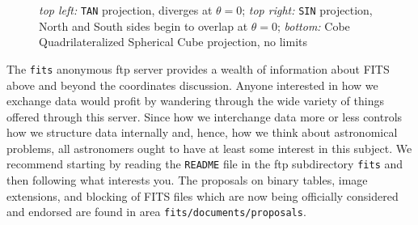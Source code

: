 \begin{figure}
\centerline{\hfill {} \hfill\hfill
             \hfill}
\centerline{}
\caption{{\it top left:\/} {\tt TAN} projection, diverges at $\theta =
   0$; {\it top right:\/} {\tt SIN} projection, North and South sides
   begin to overlap at $\theta = 0$; {\it bottom:\/} Cobe
   Quadrilateralized Spherical Cube projection, no limits }
\end{figure}

The {\tt fits} anonymous ftp server provides a wealth of information
about FITS above and beyond the coordinates discussion.  Anyone
interested in how we exchange data would profit by wandering through
the wide variety of things offered through this server.  Since how we
interchange data more or less controls how we structure data
internally and, hence, how we think about astronomical problems, all
astronomers ought to have at least some interest in this subject.  We
recommend starting by reading the {\tt README} file in the ftp
subdirectory {\tt fits} and then following what interests you.  The
proposals on binary tables, image extensions, and blocking of FITS
files which are now being officially considered and endorsed are found
in area {\tt fits/documents/proposals}.


